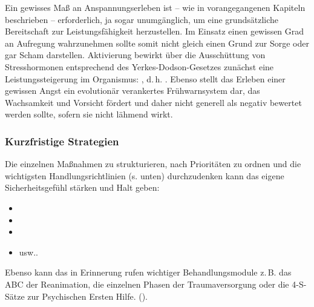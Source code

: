 {Ein gewisses Maß an
Anspannungserleben ist -- wie in vorangegangenen Kapiteln
beschrieben -- erforderlich, ja sogar unumgänglich, um eine
grundsätzliche Bereitschaft zur Leistungsfähigkeit
herzustellen. Im Einsatz einen gewissen Grad an Aufregung
wahrzunehmen sollte somit nicht gleich einen Grund zur Sorge
oder gar Scham darstellen. Aktivierung bewirkt über die
Ausschüttung von Stresshormonen entsprechend des
Yerkes-Dodson-Gesetzes zunächst eine Leistungssteigerung im
Organismus: , d.\,h.
.  Ebenso
stellt das Erleben einer gewissen Angst ein evolutionär verankertes
Frühwarnsystem dar, das Wachsamkeit und Vorsicht fördert und
daher nicht generell als negativ bewertet werden sollte,
sofern sie nicht lähmend wirkt.}
{}
{}
{}
{}





\subsubsection{Kurzfristige Strategien}

{Die einzelnen
Maßnahmen zu strukturieren, nach Prioritäten zu ordnen und
die wichtigsten Handlungsrichtlinien (s. unten)
durchzudenken kann das eigene Sicherheitsgefühl stärken und
Halt geben:

\begin{itemize}
  \item {}
  \item {}
  \item {}
  \item {} usw..
\end{itemize}

Ebenso kann das in  Erinnerung rufen wichtiger
Behandlungsmodule z.\,B. das ABC der Reanimation, die
einzelnen Phasen der Traumaversorgung oder die 4-S-Sätze zur
Psychischen Ersten Hilfe. 
(\cite{Karutz200912}).}
{}
{}
{}
{}



